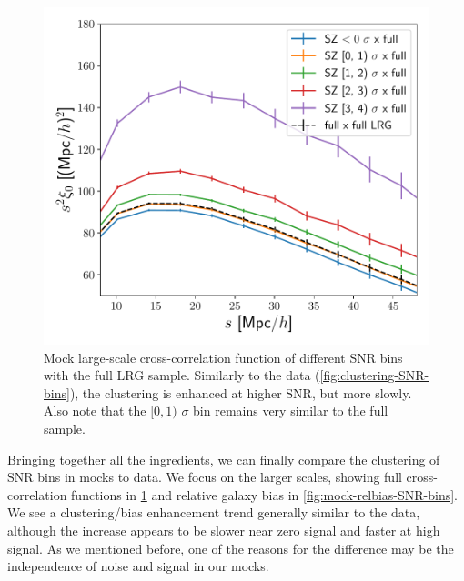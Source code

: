 \begin{figure}[htbp]
    \centering
    \includegraphics[width=\linewidth]{fig/LRG-cubic-SZ-ACTPlanck-filtered2.4-monopole-jack-errorbars.pdf}
    \caption[Mock large-scale cross-correlation function of different SNR bins with the full LRG sample]{Mock large-scale cross-correlation function of different SNR bins with the full LRG sample.
    Similarly to the data (\cref{fig:clustering-SNR-bins}), the clustering is enhanced at higher SNR, but more slowly.
    Also note that the $[0, 1)$ $\sigma$ bin remains very similar to the full sample.}
    \label{fig:mock-clustering-SNR-bins}
\end{figure}

Bringing together all the ingredients, we can finally compare the clustering of SNR bins in mocks to data.
We focus on the larger scales, showing full cross-correlation functions in \cref{fig:mock-clustering-SNR-bins} and relative galaxy bias in \cref{fig:mock-relbias-SNR-bins}.
We see a clustering/bias enhancement trend generally similar to the data, although the increase appears to be slower near zero signal and faster at high signal.
As we mentioned before, one of the reasons for the difference may be the independence of noise and signal in our mocks.

